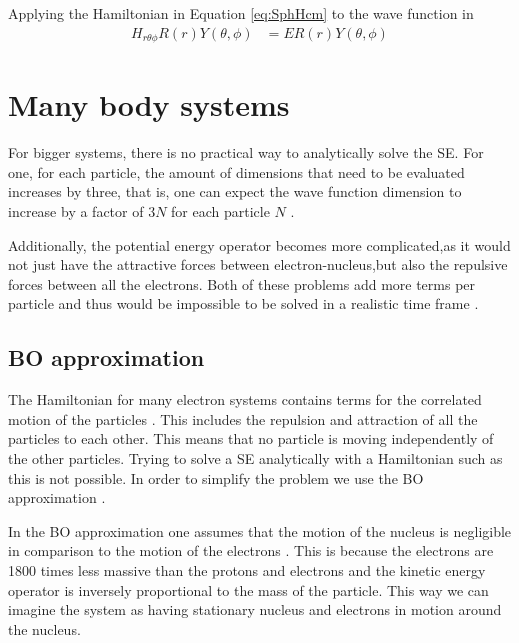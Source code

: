\documentclass[../master_thesis.tex]{subfiles}
\begin{document}
Applying the Hamiltonian in Equation \ref{eq:SphHcm} to the wave function in
\begin{equation}
  \begin{split}
    H_{r\theta\phi} R(r)Y(\theta, \phi) &= E R(r)Y(\theta, \phi)
  \end{split}
\end{equation}

\section{Many body systems}

For bigger systems, there is no practical way to analytically solve the
\ac{SE}. For one, for each particle, the amount of dimensions that need to be
evaluated increases by three, that is, one can expect the wave function
dimension to increase by a factor of $3N$ for each particle $N$
\cite{Cramer:2004}.

Additionally, the potential energy operator becomes more complicated,as it
would not just have the attractive forces between electron-nucleus,but also the
repulsive forces between all the electrons. Both of these problems add more
terms per particle and thus would be impossible to be solved in a realistic
time frame \cite{Jensen:2017}.

\subsection{\ac{BO} approximation}

The Hamiltonian for many electron systems contains terms for the correlated
motion of the particles \cite{Cramer:2004, Jensen:2017}. This includes the
repulsion and attraction of all the particles to each other. This means that no
particle is moving independently of the other particles. Trying to solve a
\ac{SE} analytically with a Hamiltonian such as this is not possible. In order
to simplify the problem we use the \ac{BO} approximation \cite{Cramer:2004,
Jensen:2017}.

In the \ac{BO} approximation one assumes that the motion of the nucleus is
negligible in comparison to the motion of the electrons \cite{Cramer:2004,
Jensen:2017}. This is because the electrons are 1800 times less massive than the
protons and electrons and the kinetic energy operator is inversely
proportional to the mass of the particle. This way we can imagine the system as
having stationary nucleus and electrons in motion around the nucleus.
\end{document}
